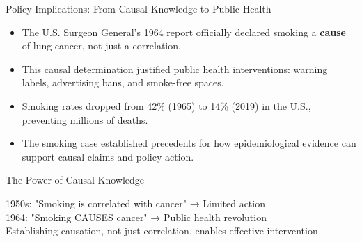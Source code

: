 \documentclass{beamer}
\begin{document}
	\begin{frame}{Policy Implications: From Causal Knowledge to Public Health}
		\begin{itemize}
			\item The U.S. Surgeon General's 1964 report officially declared smoking a \textbf{cause} of lung cancer, not just a correlation.
			\item This causal determination justified public health interventions: warning labels, advertising bans, and smoke-free spaces.
			\item Smoking rates dropped from 42\% (1965) to 14\% (2019) in the U.S., preventing millions of deaths.
			\item The smoking case established precedents for how epidemiological evidence can support causal claims and policy action.
		\end{itemize}
		
		\begin{alertblock}{The Power of Causal Knowledge}
			\begin{center}
				1950s: "Smoking is correlated with cancer" → Limited action\\
				1964: "Smoking CAUSES cancer" → Public health revolution\\
				\vspace{0.2cm}
				Establishing causation, not just correlation, enables effective intervention
			\end{center}
		\end{alertblock}
	\end{frame}
	
\end{document}
